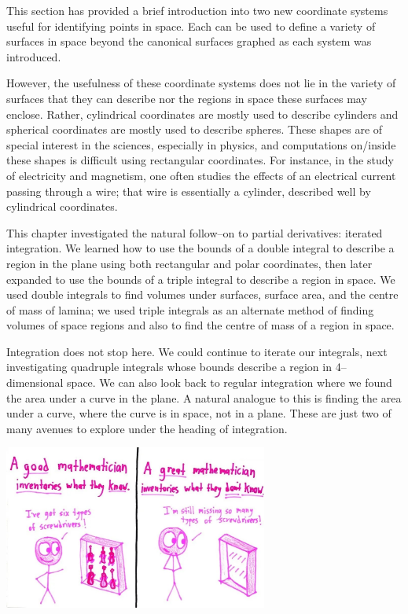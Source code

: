 This section has provided a brief introduction into two new coordinate systems useful for identifying points in space. Each can be used to define a variety of surfaces in space beyond the canonical surfaces graphed as each system was introduced.

However, the usefulness of these coordinate systems does not lie in the variety of surfaces that they can describe nor the regions in space these surfaces may enclose. Rather,  cylindrical coordinates are mostly used to describe cylinders and spherical coordinates are mostly used to describe spheres. These shapes are of special interest in the sciences, especially in physics, and computations on/inside these shapes is difficult using rectangular coordinates. For instance, in the study of electricity and magnetism, one often studies the effects of an electrical current passing through a wire; that wire is essentially a cylinder, described well by cylindrical coordinates. 

This chapter investigated the natural follow--on to partial derivatives: iterated integration. We learned how to use the bounds of a double integral to describe a region in the plane using both rectangular and polar coordinates, then later expanded to use the bounds of a triple integral to describe a region in space. We used double integrals to find volumes under surfaces, surface area, and the centre of mass of lamina; we used triple integrals as an alternate method of finding volumes of space regions and also to find the centre of mass of a region in space.

Integration does not stop here. We could continue to iterate our integrals, next investigating quadruple integrals whose bounds describe a region in 4--dimensional space. We can also look back to regular integration where we found the area under a curve in the plane. A natural analogue to this is finding the area under a curve, where the curve is in space, not in a plane. These are just two of many avenues to explore under the heading of integration.

	\begin{center}
			\includegraphics[width=0.65\textwidth]{GreatMath_7.jpg}
	\end{center}



